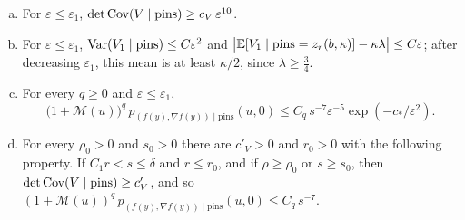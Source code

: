\begin{lemma}
\begin{enumerate}[(a)]
\item For $\varepsilon\le\varepsilon_1$, $\det\operatorname{Cov}(V\mid\text{pins})\ge c_V\,\varepsilon^{10}$.
\item For $\varepsilon\le\varepsilon_1$, $\operatorname{Var}(V_1\mid\text{pins})\le C\varepsilon^2$ and $\bigl|\mathbb E[V_1\mid\text{pins}=z_r(b,\kappa)]-\kappa\lambda\bigr|\le C\varepsilon$; after decreasing $\varepsilon_1$, this mean is at least $\kappa/2$, since $\lambda\ge\frac34$.
\item For every $q\ge0$ and $\varepsilon\le\varepsilon_1$,
\[
\bigl(1+\mathcal M(u)\bigr)^q\,p_{(f(y),\nabla f(y))\mid\text{pins}}(u,0)\le C_q\,s^{-7}\varepsilon^{-5}\exp(-c_*/\varepsilon^2).
\]
\item For every $\rho_0>0$ and $s_0>0$ there are $c'_V>0$ and $r_0>0$ with the following property. If $C_1r<s\le\delta$ and $r\le r_0$, and if $\rho\ge\rho_0$ or $s\ge s_0$, then $\det\operatorname{Cov}(V\mid\text{pins})\ge c'_V$, and so $(1+\mathcal M(u))^q\,p_{(f(y),\nabla f(y))\mid\text{pins}}(u,0)\le C_q\,s^{-7}$.
\end{enumerate}
\end{lemma}

